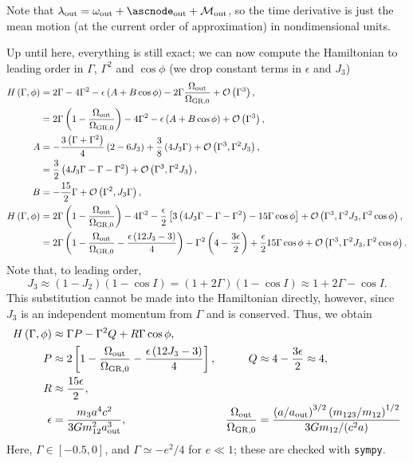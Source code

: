 \documentclass[10pt,
        usenames, %
        dvipsnames %
    ]{article}
\newcommand*{\p}[1]{\left(#1\right)}
\newcommand*{\s}[1]{\left[#1\right]}
\begin{document}
Note that $\lambda_{\rm out} = \omega_{\rm out} + \ascnode_{\rm out} +
\mathcal{M}_{\rm out}$, so the time derivative is just the mean motion (at the
current order of approximation) in nondimensional units.

Up until here, everything is still exact; we can now compute the Hamiltonian to
leading order in $\Gamma$, $\Gamma^2$ and $\cos \phi$ (we drop constant terms in
$\epsilon$ and $J_3$)
\begin{align}
    H\p{\Gamma, \phi} &=
        2\Gamma - 4\Gamma^2 - \epsilon\p{A + B\cos\phi} - 2\Gamma\frac{\Omega_{\rm
            out}}{\Omega_{\rm GR, 0}} + \mathcal{O}\p{\Gamma^3},\\
        &= 2\Gamma\p{1 - \frac{\Omega_{\rm out}}{\Omega_{\rm GR, 0}}}
            - 4\Gamma^2 - \epsilon\p{A + B \cos \phi} +
            \mathcal{O}\p{\Gamma^3},\\
    A &= -\frac{3\p{\Gamma + \Gamma^2}}{4}\p{2 - 6J_3}
        + \frac{3}{8}\p{4J_3\Gamma}
        + \mathcal{O}\p{\Gamma^3, \Gamma^2J_3},\\
        &= \frac{3}{2}\p{4J_3\Gamma - \Gamma - \Gamma^2}
            + \mathcal{O}\p{\Gamma^3, \Gamma^2J_3},\\
    B &= -\frac{15}{2}\Gamma + \mathcal{O}\p{\Gamma^2, J_3\Gamma},\\
    H\p{\Gamma, \phi}
        &= 2\Gamma\p{1 - \frac{\Omega_{\rm out}}{\Omega_{\rm GR, 0}}}
            - 4\Gamma^2 - \frac{\epsilon}{2}\s{
                3\p{4J_3\Gamma - \Gamma - \Gamma^2}
                - 15 \Gamma \cos \phi} +
            \mathcal{O}\p{\Gamma^3, \Gamma^2 J_3, \Gamma^2 \cos \phi},\\
        &= 2\Gamma\p{1 - \frac{\Omega_{\rm out}}{\Omega_{\rm GR, 0}}
            -\frac{\epsilon\p{12J_3 - 3}}{4}}
            - \Gamma^2\p{4 - \frac{3\epsilon}{2}} + \frac{\epsilon}{2}
                 15 \Gamma \cos \phi +
            \mathcal{O}\p{\Gamma^3, \Gamma^2 J_3, \Gamma^2 \cos \phi}.
\end{align}
Note that, to leading order,
\begin{equation}
    J_3 \approx \p{1 - J_2}\p{1 - \cos I} = \p{1 + 2\Gamma}\p{1 - \cos I}
        \approx 1 + 2\Gamma - \cos I.
\end{equation}
This substitution cannot be made into the Hamiltonian directly, however, since
$J_3$ is an independent momentum from $\Gamma$ and is conserved. Thus, we obtain
\begin{align}
    H\p{\Gamma,\phi} &\approx \Gamma P - \Gamma^2 Q + R \Gamma \cos \phi,&&\\
        P &\approx 2\s{1 - \frac{\Omega_{\rm out}}{\Omega_{\rm GR, 0}} -
            \frac{\epsilon\p{12 J_3 - 3}}{4}},&
        Q &\approx 4 - \frac{3\epsilon}{2} \approx 4,\nonumber\\
        R &\approx \frac{15\epsilon}{2},\\
        \epsilon &= \frac{m_3a^4 c^2}{3Gm_{12}^2a_{\rm out}^3},&
        \frac{\Omega_{\rm out}}{\Omega_{\rm GR, 0}}
            &= \frac{\p{a / a_{\rm out}}^{3/2}\p{m_{123} / m_{12}}^{1/2}}{
                3Gm_{12} / (c^2a)}
\end{align}
Here, $\Gamma \in [-0.5, 0]$, and $\Gamma \simeq -e^2/4$ for $e \ll 1$; these
are checked with \lstinline{sympy}.
\end{document}

